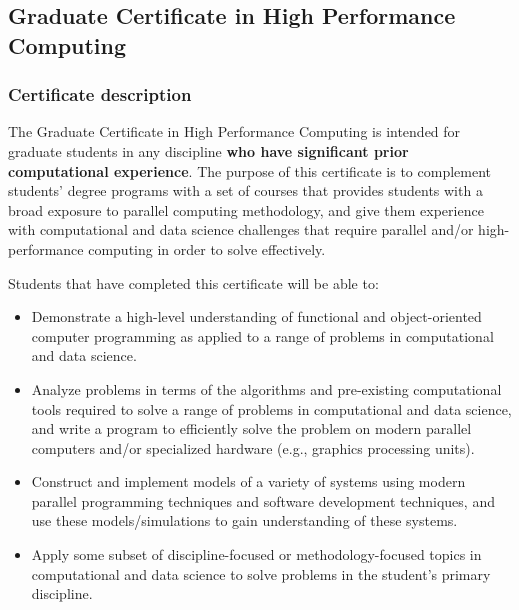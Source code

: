 \subsection{Graduate Certificate in High Performance Computing}
\label{sec:cert_hpc}

\subsubsection{Certificate description}

The Graduate Certificate in High Performance Computing is intended for
graduate students in any discipline \textbf{who have significant prior
computational experience}.  The purpose of this certificate is to
complement students' degree programs with a set of courses that
provides students with a broad exposure to parallel computing
methodology, and give them experience with computational and data
science challenges that require parallel and/or high-performance
computing in order to solve effectively.

\vspace{2mm}

\noindent
Students that have completed this certificate will be able to:

\begin{itemize}
\item  Demonstrate a high-level understanding of functional and
  object-oriented computer programming as applied to a range of
  problems in computational and data science.

\item  Analyze problems in terms of the algorithms and pre-existing
  computational tools required to solve a range of problems in
  computational and data science, and write a program to efficiently
  solve the problem on modern parallel computers and/or specialized
  hardware (e.g., graphics processing units).

\item  Construct and implement models of a variety of systems using
  modern parallel programming techniques and software development
  techniques, and use these models/simulations to gain understanding
  of these systems.

\item  Apply some subset of discipline-focused or methodology-focused
topics in computational and data science to solve problems in the
student’s primary discipline.

\end{itemize}

